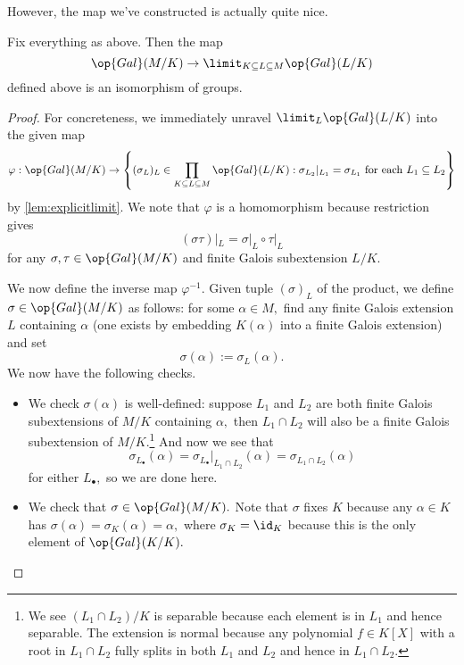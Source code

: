 However, the map we've constructed is actually quite nice.
\begin{proposition}
	Fix everything as above. Then the map
	\[\op{Gal}(M/K)\to\limit_{K\subseteq L\subseteq M}\op{Gal}(L/K)\]
	defined above is an isomorphism of groups.
\end{proposition}
\begin{proof}
	For concreteness, we immediately unravel $\limit_L\op{Gal}(L/K)$ into the given map
	\[\varphi:\op{Gal}(M/K)\to\left\{(\sigma_L)_L\in\prod_{K\subseteq L\subseteq M}\op{Gal}(L/K):\sigma_{L_2}|_{L_1}=\sigma_{L_1}\text{ for each }L_1\subseteq L_2\right\}\]
	by \autoref{lem:explicitlimit}. We note that $\varphi$ is a homomorphism because restriction gives
	\[(\sigma\tau)|_L=\sigma|_L\circ\tau|_L\]
	for any $\sigma,\tau\in\op{Gal}(M/K)$ and finite Galois subextension $L/K.$

	We now define the inverse map $\varphi^{-1}.$ Given tuple $(\sigma)_L$ of the product, we define $\sigma\in\op{Gal}(M/K)$ as follows: for some $\alpha\in M,$ find any finite Galois extension $L$ containing $\alpha$ (one exists by embedding $K(\alpha)$ into a finite Galois extension) and set
	\[\sigma(\alpha):=\sigma_L(\alpha).\]
	We now have the following checks.
	\begin{itemize}
		\item We check $\sigma(\alpha)$ is well-defined: suppose $L_1$ and $L_2$ are both finite Galois subextensions of $M/K$ containing $\alpha,$ then $L_1\cap L_2$ will also be a finite Galois subextension of $M/K.$\footnote{We see $(L_1\cap L_2)/K$ is separable because each element is in $L_1$ and hence separable. The extension is normal because any polynomial $f\in K[X]$ with a root in $L_1\cap L_2$ fully splits in both $L_1$ and $L_2$ and hence in $L_1\cap L_2.$} And now we see that
		\[\sigma_{L_\bullet}(\alpha)=\sigma_{L_\bullet}|_{L_1\cap L_2}(\alpha)=\sigma_{L_1\cap L_2}(\alpha)\]
		for either $L_\bullet,$ so we are done here.
		\item We check that $\sigma\in\op{Gal}(M/K).$ Note that $\sigma$ fixes $K$ because any $\alpha\in K$ has $\sigma(\alpha)=\sigma_K(\alpha)=\alpha,$ where $\sigma_K=\id_K$ because this is the only element of $\op{Gal}(K/K).$
		

\end{itemize}
\end{proof}
